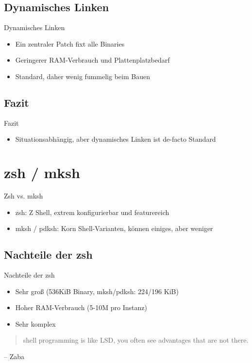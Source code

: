 \documentclass{beamer}
\begin{document}
\subsection{Dynamisches Linken}
\begin{frame}{Dynamisches Linken}
	\begin{itemize}
		\item Ein zentraler Patch fixt alle Binaries
		\item Geringerer RAM-Verbrauch und Plattenplatzbedarf
		\item Standard, daher wenig fummelig beim Bauen
	\end{itemize}
\end{frame}

\subsection{Fazit}
\begin{frame}{Fazit}
	\begin{itemize}
		\item Situationsabhängig, aber dynamisches Linken ist de-facto
			Standard
	\end{itemize}
\end{frame}

\section{zsh / mksh}
\begin{frame}{Zsh vs. mksh}
	\begin{itemize}
		\item zsh: Z Shell, extrem konfigurierbar und featurereich
		\item mksh / pdksh: Korn Shell-Varianten, können einiges, aber weniger
	\end{itemize}
\end{frame}

\subsection{Nachteile der zsh}
\begin{frame}{Nachteile der zsh}
	\begin{itemize}
		\item Sehr groß (536KiB Binary, mksh/pdksh: 224/196 KiB)
		\item Hoher RAM-Verbrauch (5-10M pro Instanz)
		\item Sehr komplex %
	\end{itemize}
	\pause
	\begin{quote}
		shell programming is like LSD, you often see advantages that are not
		there.
	\end{quote}
	\begin{flushright}
		-- Zaba
	\end{flushright}
\end{frame}
\end{document}
